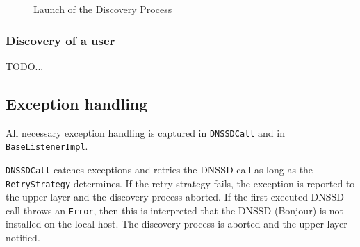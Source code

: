 \begin{figure}[H]
 \centering
 \caption{Launch of the Discovery Process}
 \label{fig:network.discovery.launch}
\end{figure}

\subsubsection{Discovery of a user}
TODO...


\subsection{Exception handling}
All necessary exception handling is captured in \texttt{DNSSDCall} and in \texttt{BaseListenerImpl}. 

\texttt{DNSSDCall} catches exceptions and retries the DNSSD call as long as the \texttt{RetryStrategy} determines. If the retry strategy fails, the exception is reported to the upper layer and the discovery process aborted. If the first executed DNSSD call throws an \texttt{Error}, then this is interpreted that the DNSSD (Bonjour) is not installed on the local host. The discovery process is aborted and the upper layer notified.


